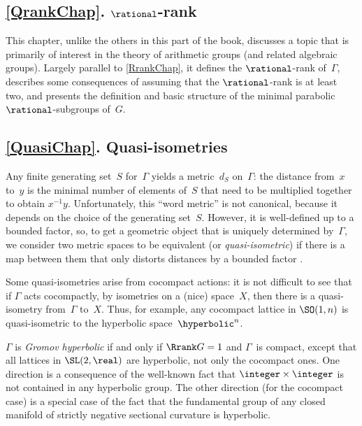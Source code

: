 \subsection*{\cref{QrankChap}.  $\rational$-rank}
This chapter, unlike the others in this part of the book, discusses a topic that is primarily of interest in the theory of arithmetic groups (and related algebraic groups). Largely parallel to \cref{RrankChap}, it defines the $\rational$-rank of~$\Gamma$, describes some consequences of assuming that the $\rational$-rank is at least two, and presents the definition and basic structure of the minimal parabolic $\rational$-subgroups of~$G$.




\smallbreak

\subsection*{\cref{QuasiChap}. Quasi-isometries}
Any finite generating set~$S$ for~$\Gamma$ yields a metric~$d_S$ on~$\Gamma$: the distance from~$x$ to~$y$ is the minimal number of elements of~$S$ that need to be multiplied together to obtain $x^{-1} y$. Unfortunately, this ``word metric'' is not canonical, because it depends on the choice of the generating set~$S$. However, it is  well-defined up to a bounded factor, so, to get a geometric object that is uniquely determined by~$\Gamma$, we consider two metric spaces to be equivalent (or \emph{quasi-isometric}) if there is a map between them that only distorts distances by a bounded factor . 

\smallbreak

 Some quasi-isometries arise from cocompact actions: it is not difficult to see that if $\Gamma$ acts cocompactly, by isometries on a (nice) space~$X$, then there is a quasi-isometry from~$\Gamma$ to~$X$. Thus, for example, any cocompact lattice in $\SO(1,n)$ is quasi-isometric to the hyperbolic space~$\hyperbolic^n$.

\smallbreak

$\Gamma$ is \emph{Gromov hyperbolic} if and only if $\Rrank G = 1$ and $\Gamma$~is compact, except that all lattices in $\SL(2,\real)$ are hyperbolic, not only the cocompact ones. One direction is a consequence of the well-known fact that $\integer \times \integer$ is not contained in any hyperbolic group. The other direction (for the cocompact case) is a special case of the fact that the fundamental group of any closed manifold of strictly negative sectional curvature is hyperbolic.






